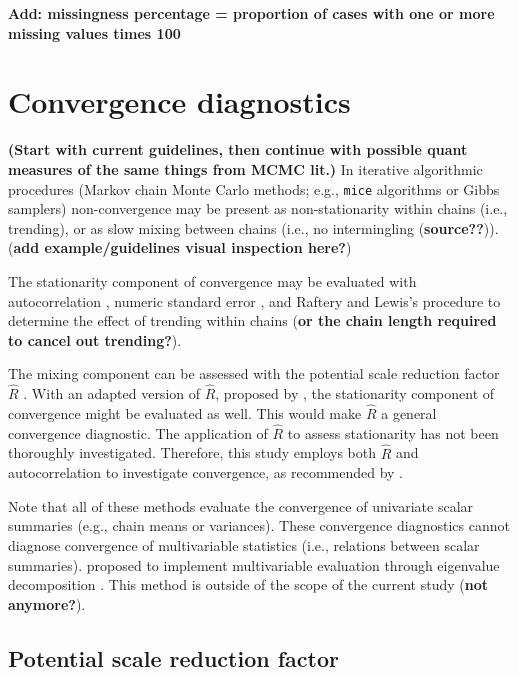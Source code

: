 \documentclass[Royal,times,sageh]{sagej}
\begin{document}
\textbf{Add: missingness percentage = proportion of cases with one or
more missing values times 100 }

\hypertarget{convergence-diagnostics}{%
\section{Convergence diagnostics}\label{convergence-diagnostics}}

\textbf{(Start with current guidelines, then continue with possible
quant measures of the same things from MCMC lit.)} In iterative
algorithmic procedures (Markov chain Monte Carlo methods; e.g.,
\texttt{mice} algorithms or Gibbs samplers) non-convergence may be
present as non-stationarity within chains (i.e., trending), or as slow
mixing between chains (i.e., no intermingling (\textbf{source??})).
(\textbf{add example/guidelines visual inspection here?})

The stationarity component of convergence may be evaluated with
autocorrelation \citep[\(AC\);][]{scha97, gelm13}, numeric standard
error \citep[or `MC error';][]{gewe92}, and Raftery and Lewis's
\citeyearpar{raft91} procedure to determine the effect of trending
within chains (\textbf{or the chain length required to cancel out
trending?}).

The mixing component can be assessed with the potential scale reduction
factor \(\widehat{R}\) \citep[a.k.a. `Gelman-Rubin
statistic';][]{gelm92}. With an adapted version of \(\widehat{R}\),
proposed by \citet{veht19}, the stationarity component of convergence
might be evaluated as well. This would make \(\widehat{R}\) a general
convergence diagnostic. The application of \(\widehat{R}\) to assess
stationarity has not been thoroughly investigated. Therefore, this study
employs both \(\widehat{R}\) and autocorrelation to investigate
convergence, as recommended by \citep[p.~898]{cowl96}.

Note that all of these methods evaluate the convergence of univariate
scalar summaries (e.g., chain means or variances). These convergence
diagnostics cannot diagnose convergence of multivariable statistics
(i.e., relations between scalar summaries). \citet{buur18} proposed to
implement multivariable evaluation through eigenvalue decomposition
\citep{mack03}. This method is outside of the scope of the current study
(\textbf{not anymore?}).

\hypertarget{potential-scale-reduction-factor}{%
\subsection{Potential scale reduction
factor}\label{potential-scale-reduction-factor}}
\end{document}

